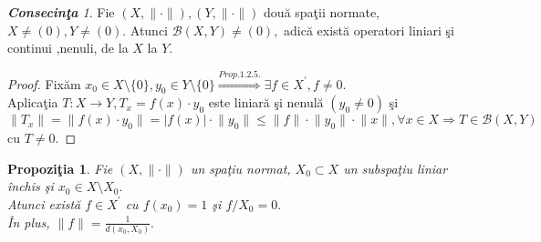 \documentclass[ a4paper, 12pt]{report}
\newtheorem{prop}[theorem]{\bf Propozi\c tia }
\theoremstyle{definition}
\theoremstyle{remark}
\newtheorem{cons}{\bf Consecin\c ta }[section]
\numberwithin{equation}{section}
\begin{document}
\begin{cons}
Fie $(X, \lVert \cdot \rVert), (Y,\lVert \cdot  \rVert)$ dou\u a spa\c tii normate,\\ $X \neq (0), Y \neq (0)$. Atunci $\mathcal{B}(X,Y) \neq (0),$ adic\u a exist\u a operatori liniari \c si continui ,nenuli, de la $X$ la $Y$.  
\end{cons}
\begin{proof}
Fix\u am $x_0 \in X\setminus \{ 0 \}, y_0 \in Y \setminus \{ 0 \} \stackrel{Prop.1.2.5.}{\Longrightarrow} \exists f \in X^{'}, f \neq 0.$\\
Aplica\c tia $T : X \rightarrow Y, T_x = f(x) \cdot y_0$ este liniar\u a \c si nenul\u a $(y_0 \neq 0)$ \c si $\lVert T_x \rVert = \lVert f(x) \cdot y_0 \rVert = \lvert f(x) \rvert \cdot \lVert y_0 \rVert \leq \lVert f  \rVert \cdot \lVert y_0 \rVert \cdot \lVert x \rVert, \forall x \in X \Rightarrow T \in \mathcal{B}(X,Y) $ cu $T \neq 0.$
\end{proof}
\begin{prop}
Fie $(X,\lVert \cdot \rVert)$ un spa\c tiu normat, $X_0 \subset X$ un subspa\c tiu liniar \^inchis \c si $x_0 \in X \setminus X_0.$\\
Atunci exist\u a $f \in X^{'}$ cu $f(x_0) = 1$ \c si $f/X_0 = 0.$\\
\^In plus, $\lVert f \rVert = \frac{1}{d(x_0,X_0)}.$
\end{prop}
\end{document}
